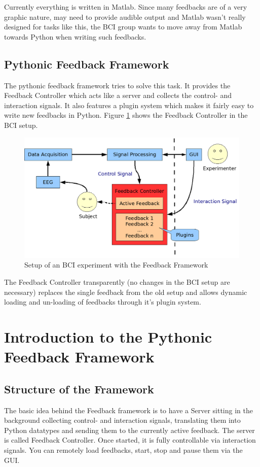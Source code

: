Currently everything is written in Matlab. Since many feedbacks are of a very graphic nature, may need to provide audible output and Matlab wasn't really designed for tasks like this, the BCI group wants to move away from Matlab towards Python when writing such feedbacks.

\subsection{Pythonic Feedback Framework}
The pythonic feedback framework tries to solve this task. It provides the Feedback Controller which acts like a server and collects the control- and interaction signals. It also features a plugin system which makes it fairly easy to write new feedbacks in Python. Figure \ref{fig:setup2} shows the Feedback Controller in the BCI setup.

\begin{figure}
 \centering
 \includegraphics[width=\figwidth]{aufbau2-en.png}
 \caption{Setup of an BCI experiment with the Feedback Framework}
 \label{fig:setup2}
\end{figure}

The Feedback Controller transparently (no changes in the BCI setup are necessary) replaces the single feedback from the old setup and allows dynamic loading and un-loading of feedbacks through it's plugin system. 

\section{Introduction to the Pythonic Feedback Framework}

\subsection{Structure of the Framework}
The basic idea behind the Feedback framework is to have a Server sitting in the background collecting control- and interaction signals, translating them into Python datatypes and sending them to the currently active feedback. The server is called Feedback Controller. Once started, it is fully controllable via interaction signals. You can remotely load feedbacks, start, stop and pause them via the GUI.

